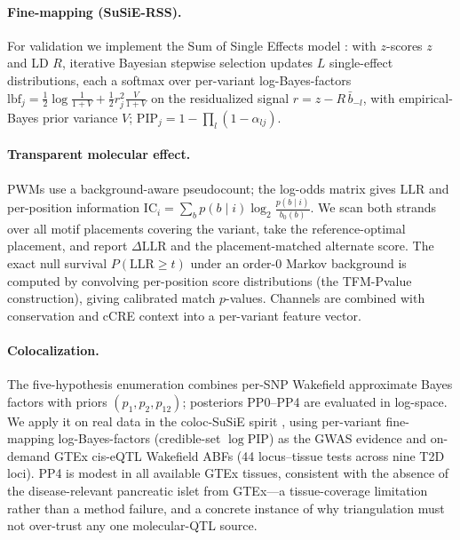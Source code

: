 \documentclass[10pt]{article}
\begin{document}
\paragraph{Fine-mapping (SuSiE-RSS).} For validation we implement the Sum of Single Effects model
\citep{wang2020susie,zou2022susierss}: with $z$-scores $z$ and LD $R$, iterative Bayesian stepwise
selection updates $L$ single-effect distributions, each a softmax over per-variant log-Bayes-factors
$\mathrm{lbf}_j=\tfrac12\log\tfrac{1}{1+V}+\tfrac12 r_j^2\tfrac{V}{1+V}$ on the residualized signal
$r=z-R\,\bar b_{-l}$, with empirical-Bayes prior variance $V$; $\mathrm{PIP}_j=1-\prod_l(1-\alpha_{lj})$.

\paragraph{Transparent molecular effect.} PWMs use a background-aware pseudocount; the log-odds matrix
gives $\mathrm{LLR}$ and per-position information $\mathrm{IC}_i=\sum_b p(b\mid i)\log_2\tfrac{p(b\mid i)}{b_0(b)}$.
We scan both strands over all motif placements covering the variant, take the reference-optimal placement,
and report $\Delta\mathrm{LLR}$ and the placement-matched alternate score. The exact null survival
$P(\mathrm{LLR}\ge t)$ under an order-0 Markov background is computed by convolving per-position score
distributions (the TFM-Pvalue construction), giving calibrated match $p$-values. Channels are combined
with conservation and cCRE context into a per-variant feature vector.

\paragraph{Colocalization.} The five-hypothesis enumeration \citep{giambartolomei2014coloc} combines
per-SNP Wakefield approximate Bayes factors with priors $(p_1,p_2,p_{12})$; posteriors PP0--PP4 are
evaluated in log-space. We apply it on real data in the coloc-SuSiE spirit \citep{wallace2021colocsusie},
using per-variant fine-mapping log-Bayes-factors (credible-set $\log\mathrm{PIP}$) as the GWAS evidence and
on-demand GTEx cis-eQTL Wakefield ABFs (44 locus--tissue tests across nine T2D loci). PP4 is modest in all
available GTEx tissues, consistent with the absence of the disease-relevant pancreatic islet from GTEx---a
tissue-coverage limitation rather than a method failure, and a concrete instance of why triangulation must
not over-trust any one molecular-QTL source.
\end{document}

